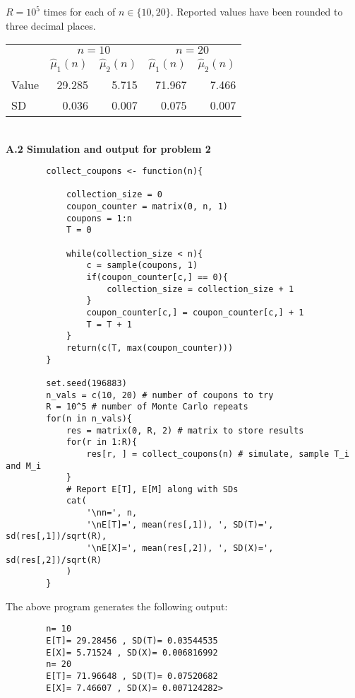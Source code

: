 \documentclass[11pt, letterpaper]{article}
\begin{document}
    $R=10^5$ times for each of $n\in\{10,20\}$. Reported values have been rounded to three decimal places.
    \begin{center}
        \begin{tabular}{@{}l|rrrr@{}}\toprule
                & \multicolumn{2}{c}{$n=10$} & \multicolumn{2}{c}{$n=20$}\\
            \cmidrule(lr){2-3}\cmidrule(lr){4-5}
                & $\hat{\mu}_1(n)$ & $\hat{\mu}_2(n)$ & $\hat{\mu}_1(n)$ & $\hat{\mu}_2(n)$\\\midrule
            Value & 29.285 & 5.715 & 71.967 & 7.466 \\ 
            SD & 0.036 & 0.007 & 0.075 & 0.007 \\
            \bottomrule
        \end{tabular}
    \end{center}
    \\[10pt]
    {\bf A.2 Simulation and output for problem 2}
    \begin{verbatim}
        collect_coupons <- function(n){

            collection_size = 0
            coupon_counter = matrix(0, n, 1)
            coupons = 1:n
            T = 0

            while(collection_size < n){
                c = sample(coupons, 1)
                if(coupon_counter[c,] == 0){
                    collection_size = collection_size + 1
                }
                coupon_counter[c,] = coupon_counter[c,] + 1
                T = T + 1
            }
            return(c(T, max(coupon_counter)))
        }

        set.seed(196883)
        n_vals = c(10, 20) # number of coupons to try
        R = 10^5 # number of Monte Carlo repeats
        for(n in n_vals){
            res = matrix(0, R, 2) # matrix to store results
            for(r in 1:R){
                res[r, ] = collect_coupons(n) # simulate, sample T_i and M_i
            }
            # Report E[T], E[M] along with SDs
            cat(
                '\nn=', n,
                '\nE[T]=', mean(res[,1]), ', SD(T)=', sd(res[,1])/sqrt(R),
                '\nE[X]=', mean(res[,2]), ', SD(X)=', sd(res[,2])/sqrt(R)
            )
        }
    \end{verbatim} 
    The above program generates the following output:
    \begin{verbatim}
        n= 10 
        E[T]= 29.28456 , SD(T)= 0.03544535 
        E[X]= 5.71524 , SD(X)= 0.006816992
        n= 20 
        E[T]= 71.96648 , SD(T)= 0.07520682 
        E[X]= 7.46607 , SD(X)= 0.007124282> 
    \end{verbatim}
\end{document}
